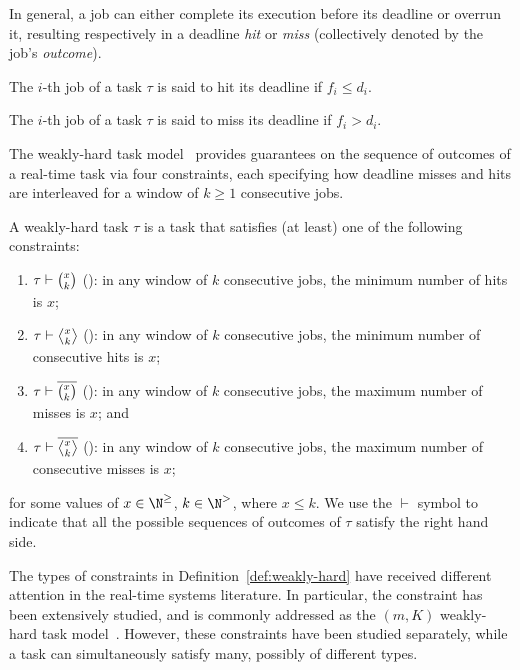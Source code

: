 In general, a job can either complete its execution before its deadline or overrun it, resulting respectively in a deadline \emph{hit} or \emph{miss} (collectively denoted by the job's \emph{outcome}).
%
\begin{definition}%
\label{def:hit}%
    The $i$-th job of a task $\tau$ is said to hit its deadline if $f_i \leq d_i$.
\end{definition}
%
\begin{definition}%
\label{def:miss}%
    The $i$-th job of a task $\tau$ is said to miss its deadline if $f_i > d_i$.
\end{definition}
%
The weakly-hard task model~\cite{Bernat:2001, Bernat:1998} provides guarantees on the sequence of outcomes of a real-time task via four constraints, each specifying how deadline misses and hits are interleaved for a window of $k \geq 1$ consecutive jobs.
%
\begin{definition}%
\label{def:weakly-hard}%
    A weakly-hard task $\tau$ is a task that satisfies (at least) one of the following constraints:
    \begin{enumerate}[label=(\roman*)]
        \item \label{item:AnyHit} $\tau \vdash \binom{x_{}}{k_{}}$ (\tAH{}): in any window of $k$ consecutive jobs, the minimum number of hits is $x$;
        \item \label{item:RowHit} $\tau \vdash \rowhit{}$ (\tRH{}): in any window of $k$ consecutive jobs, the minimum number of consecutive hits is $x$;
        \item \label{item:AnyMiss} $\tau \vdash \overline{\binom{x_{}}{k_{}}}$ (\tAM{}): in any window of $k$ consecutive jobs, the maximum number of misses is $x$; and
        \item \label{item:RowMiss} $\tau \vdash \rowmiss{}$ (\tRM{}): in any window of $k$ consecutive jobs, the maximum number of consecutive misses is $x$;
    \end{enumerate}
    for some values of $x\in \N^\geq$, $k \in \N^>$, where $x\leq k$. We use the $\vdash$ symbol to indicate that all the possible sequences of outcomes of $\tau$ satisfy the right hand side.
\end{definition}
%
The types of constraints in Definition~\ref{def:weakly-hard} have received different attention in the real-time systems literature. 
In particular, the \tAM{} constraint has been extensively studied, and is commonly addressed as the $(m,K)$ weakly-hard task model~\cite{Hamdaoui:1995, Hammadeh:2017a, Hammadeh:2017b, Sun:2017, Ahrendts:2018, Pazzaglia:2018}. 
However, these constraints have been studied separately, while a task can simultaneously satisfy many, possibly of different types.

